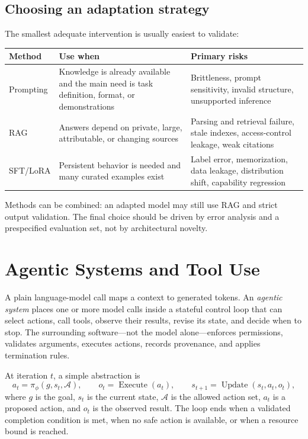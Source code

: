 \documentclass[12pt,oneside]{book}
\numberwithin{equation}{section}
\theoremstyle{definition}
\theoremstyle{plain}
\theoremstyle{remark}
\begin{document}
\subsection{Choosing an adaptation strategy}

The smallest adequate intervention is usually easiest to validate:
\begin{center}
\begin{tabular}{>{\raggedright\arraybackslash}p{}
                >{\raggedright\arraybackslash}p{}
                >{\raggedright\arraybackslash}p{}}
\toprule
\textbf{Method} & \textbf{Use when} & \textbf{Primary risks}\\
\midrule
Prompting & Knowledge is already available and the main need is task definition,
format, or demonstrations & Brittleness, prompt sensitivity, invalid structure,
unsupported inference\\
RAG & Answers depend on private, large, attributable, or changing sources &
Parsing and retrieval failure, stale indexes, access-control leakage, weak
citations\\
SFT/LoRA & Persistent behavior is needed and many curated examples exist & Label
error, memorization, data leakage, distribution shift, capability regression\\
\bottomrule
\end{tabular}
\end{center}
Methods can be combined: an adapted model may still use RAG and strict output
validation.  The final choice should be driven by error analysis and a
prespecified evaluation set, not by architectural novelty.

\section{Agentic Systems and Tool Use}

A plain language-model call maps a context to generated tokens.  An
\emph{agentic system} places one or more model calls inside a stateful control
loop that can select actions, call tools, observe their results, revise its
state, and decide when to stop.  The surrounding software---not the model
alone---enforces permissions, validates arguments, executes actions, records
provenance, and applies termination rules.

At iteration $t$, a simple abstraction is
\[
 a_t=\pi_\phi(g,s_t,\mathcal A),
 \qquad
 o_t=\operatorname{Execute}(a_t),
 \qquad
 s_{t+1}=\operatorname{Update}(s_t,a_t,o_t),
\]
where $g$ is the goal, $s_t$ is the current state, $\mathcal A$ is the allowed
action set, $a_t$ is a proposed action, and $o_t$ is the observed result.  The
loop ends when a validated completion condition is met, when no safe action is
available, or when a resource bound is reached.
\end{document}
